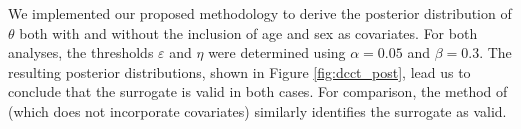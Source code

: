 \documentclass[referee,usenatbib]{biom}
\begin{document}

We implemented our proposed methodology to derive the posterior distribution of \(\theta\) both with and without the inclusion of age and sex as covariates. For both analyses, the thresholds \(\varepsilon\) and \(\eta\) were determined using \(\alpha = 0.05\) and \(\beta = 0.3\). The resulting posterior distributions, shown in Figure \ref{fig:dcct_post}, lead us to conclude that the surrogate is valid in both cases. For comparison, the method of \citet{parast2024rank} (which does not incorporate covariates) similarly identifies the surrogate as valid.
\end{document}

